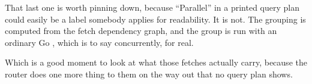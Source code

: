 That last one is worth pinning down, because \enquote{Parallel} in a printed
query plan could easily be a label somebody applies for readability. It is not.
The grouping is computed from the fetch dependency graph, and the group is run
with an ordinary Go , which is to say concurrently, for real.

\medskip
Which is a good moment to look at what those fetches actually carry, because the
router does one more thing to them on the way out that no query plan shows.

%
